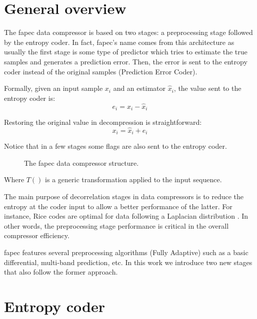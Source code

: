 \section{General overview}
The \acrshort{fapec} data compressor is based on two stages: a preprocessing stage followed by the entropy coder. In fact, \acrshort{fapec}'s name comes from this architecture as usually the first stage is some type of predictor which tries to estimate the true samples and generates a prediction error. Then, the error is sent to the entropy coder instead of the original samples (Prediction Error Coder).

Formally, given an input sample $x_i$ and an estimator $\hat{x}_i$, the value sent to the entropy coder is:
\begin{equation}
e_i = x_i - \hat{x}_i
\end{equation}

Restoring the original value in decompression is straightforward:
\begin{equation}
x_i = \hat{x}_i + e_i
\end{equation}

Notice that in a few stages some flags are also sent to the entropy coder.

\begin{figure}[h!]
	\begin{center}
		\scalebox{.565}{}
	\end{center}
	\caption{The \acrshort{fapec} data compressor structure.}
	\label{fig:fapec_structure}
\end{figure}

Where $T()$ is a generic transformation applied to the input sequence.

The main purpose of decorrelation stages in data compressors is to reduce the entropy at the coder input to allow a better performance of the latter. For instance, Rice codes are optimal for data following a Laplacian distribution \parencite{OptimalRice}. In other words, the preprocessing stage performance is critical in the overall compressor efficiency.

\acrshort{fapec} features several preprocessing algorithms (Fully Adaptive) such as a basic differential, multi-band prediction, etc. In this work we introduce two new stages that also follow the former approach.



\section{Entropy coder}
